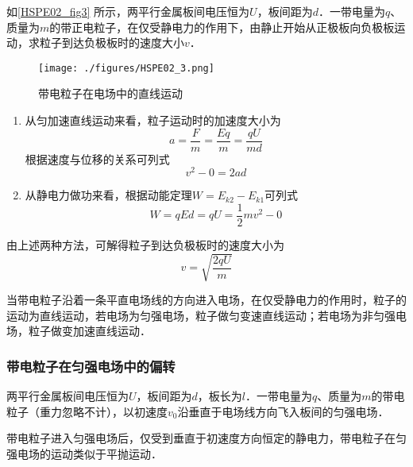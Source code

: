 \begin{example}{}
如\autoref{HSPE02_fig3} 所示，两平行金属板间电压恒为$U$，板间距为$d$．一带电量为$q$、质量为$m$的带正电粒子，在仅受静电力的作用下，由静止开始从正极板向负极板运动，求粒子到达负极板时的速度大小$v$．

\begin{figure}[ht]
\centering
\texttt{[image: ./figures/HSPE02\_3.png]}
\caption{带电粒子在电场中的直线运动} \label{HSPE02_fig3}
\end{figure}

\begin{enumerate}
\item 从匀加速直线运动来看，粒子运动时的加速度大小为
\begin{equation}
a = \frac{F}{m} = \frac{Eq}{m} = \frac{qU}{md}
\end{equation}
根据速度与位移的关系可列式
\begin{equation}
v^2 - 0 = 2ad
\end{equation}

\item 从静电力做功来看，根据动能定理$W=E_{k2}-E_{k1}$可列式
\begin{equation}
W=qEd=qU=\frac12 mv^2 - 0
\end{equation}
\end{enumerate}

由上述两种方法，可解得粒子到达负极板时的速度大小为
\begin{equation}
v=\sqrt{\frac{2qU}{m}}
\end{equation}

\end{example}

当带电粒子沿着一条平直电场线的方向进入电场，在仅受静电力的作用时，粒子的运动为直线运动，若电场为匀强电场，粒子做匀变速直线运动；若电场为非匀强电场，粒子做变加速直线运动．

\subsubsection{带电粒子在匀强电场中的偏转}

两平行金属板间电压恒为$U$，板间距为$d$，板长为$l$．一带电量为$q$、质量为$m$的带电粒子（重力忽略不计），以初速度$v_0$沿垂直于电场线方向飞入板间的匀强电场．

带电粒子进入匀强电场后，仅受到垂直于初速度方向恒定的静电力，带电粒子在匀强电场的运动类似于平抛运动．

